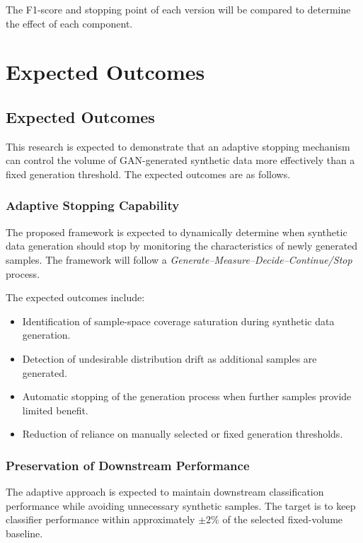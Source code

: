 \documentclass[12pt,a4paper]{report}
\begin{document}
\begin{justify}
\noindent The F1-score and stopping point of each version will be compared to determine the effect of each component.



\chapter{Expected Outcomes}
\section{Expected Outcomes}

This research is expected to demonstrate that an adaptive stopping mechanism can control the volume of GAN-generated synthetic data more effectively than a fixed generation threshold. The expected outcomes are as follows.

\subsection{Adaptive Stopping Capability}

The proposed framework is expected to dynamically determine when synthetic data generation should stop by monitoring the characteristics of newly generated samples. The framework will follow a \textit{Generate--Measure--Decide--Continue/Stop} process.

The expected outcomes include:
\begin{itemize}
    \item Identification of sample-space coverage saturation during synthetic data generation.
    \item Detection of undesirable distribution drift as additional samples are generated.
    \item Automatic stopping of the generation process when further samples provide limited benefit.
    \item Reduction of reliance on manually selected or fixed generation thresholds.
\end{itemize}

\subsection{Preservation of Downstream Performance}

The adaptive approach is expected to maintain downstream classification performance while avoiding unnecessary synthetic samples. The target is to keep classifier performance within approximately $\pm2\%$ of the selected fixed-volume baseline.


\end{justify}
\end{document}
